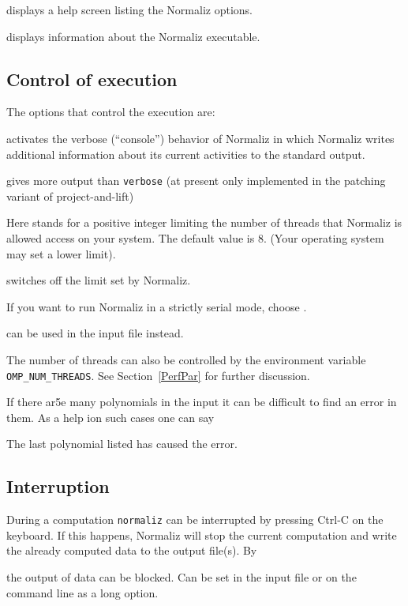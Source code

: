 \begin{itemize}
	\itemtt [-{}-help, -?] displays a help screen listing the Normaliz options.
	
	\itemtt [-{}-version] displays information about the Normaliz executable.
\end{itemize}


\subsection{Control of execution}\label{exec}

The options that control the execution are:

\begin{itemize}
	\itemtt[{-}{-}verbose, -c] activates the verbose (``console'') behavior of
	Normaliz in which Normaliz writes additional
	information about its current activities to the
	standard output.
	
	\itemtt[--talkative] gives more output than \verb*|verbose| (at present only implemented in the patching variant of project-and-lift)
	
	\itemtt[-x=<T>] Here  stands for a positive
	integer limiting the number of threads that Normaliz
	is allowed access on your system. The default value is
	$8$. (Your operating system may set a lower limit).
	
	 switches off the limit set by Normaliz.
	
	If you want to run
	Normaliz in a strictly serial mode, choose
	.

	 can be used in the input file instead.
\end{itemize}

The number of threads can also be controlled by the environment
variable \verb+OMP_NUM_THREADS+. See Section~\ref{PerfPar} for
further discussion.

If there ar5e many polynomials in the input it can be difficult to find an error in them. As a help ion such cases one can say
\begin{itemize}
\end{itemize}
The last polynomial listed has caused the error.

\subsection{Interruption}\label{interrupt}

During a computation \verb|normaliz| can be interrupted by pressing Ctrl-C on the keyboard. If this happens, Normaliz will stop the current computation and write the already computed data to the output file(s). By
\begin{itemize}
	\itemtt[NoOutputOnInterrupt]
\end{itemize}
the output of data can be blocked. Can be set in the input file or on the command line as a long option.

